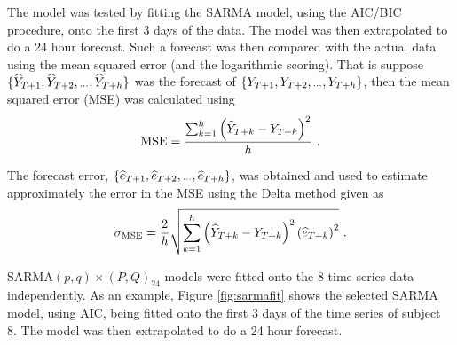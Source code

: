 \documentclass[]{article}
\newcommand{\dotdotdot}{\vphantom{.}_{\cdots}}
\begin{document}
The model was tested by fitting the SARMA model, using the AIC/BIC procedure, onto the first 3 days of the data. The model was then extrapolated to do a 24 hour forecast. Such a forecast was then compared with the actual data using the mean squared error (and the logarithmic scoring). That is suppose $\{\widehat{Y}_{T+1},\widehat{Y}_{T+2},\dotdotdot,\widehat{Y}_{T+h}\}$ was the forecast of $\{{Y}_{T+1},{Y}_{T+2},\dotdotdot,{Y}_{T+h}\}$, then the mean squared error (MSE) was calculated using
\begin{equation*}
\textup{MSE} = \frac{\sum_{k=1}^{h}\left(\widehat{Y}_{T+k}-Y_{T+k}\right)^2}{h} \ .
\end{equation*}

The forecast error, $\{\widehat{e}_{T+1},\widehat{e}_{T+2},\dotdotdot,\widehat{e}_{T+h}\}$, was obtained and used to estimate approximately the error in the MSE using the Delta method given as
\begin{equation*}
\sigma_{\textup{MSE}} = \frac{2}{h}\sqrt{\sum_{k=1}^{h}\left(\widehat{Y}_{T+k}-Y_{T+k}\right)^2\left(\widehat{e}_{T+k}\right)^2} \ .
\end{equation*}

SARMA$(p,q)\times(P,Q)_{24}$ models were fitted onto the 8 time series data independently. As an example, Figure \ref{fig:sarmafit} shows the selected SARMA model, using AIC, being fitted onto the first 3 days of the time series of subject 8. The model was then extrapolated to do a 24 hour forecast.
\end{document}
